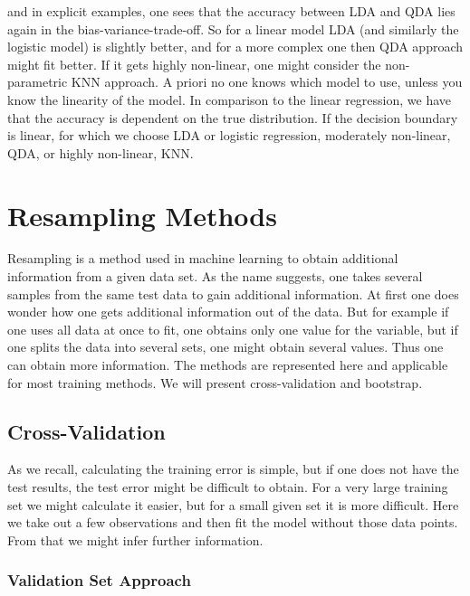 \documentclass{article}
\begin{document}
and in explicit examples, one sees that the accuracy between LDA and QDA lies again in the bias-variance-trade-off. So for a linear model LDA (and similarly the logistic model) is slightly better, and for a more complex one then QDA approach might fit better. If it gets highly non-linear, one might consider the non-parametric KNN approach. A priori no one knows which model to use, unless you know the linearity of the model. In comparison to the linear regression, we have that the accuracy is dependent on the true distribution. If the decision boundary is linear, for which we choose LDA or logistic regression, moderately non-linear, QDA, or highly non-linear, KNN.
\newpage



\section{Resampling Methods}

Resampling is a method used in machine learning to obtain additional information from a given data set. As the name suggests, one takes several samples from the same test data to gain additional information. At first one does wonder how one gets additional information out of the data. But for example if one uses all data at once to fit, one obtains only one value for the variable, but if one splits the data into several sets, one might obtain several values. Thus one can obtain more information. The methods are represented here and applicable for most training methods. We will present cross-validation and bootstrap.

\subsection{Cross-Validation}

As we recall, calculating the training error is simple, but if one does not have the test results, the test error might be difficult to obtain. For a very large training set we might calculate it easier, but for a small given set it is more difficult. Here we take out a few observations and then fit the model without those data points. From that we might infer further information.

\subsubsection{Validation Set Approach}
\end{document}

